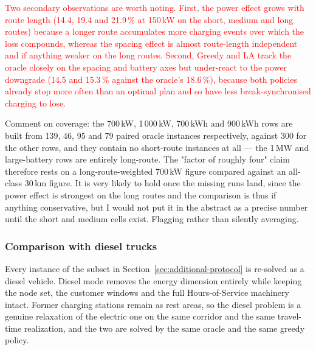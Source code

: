 \documentclass[preprint,12pt,3p]{elsarticle}
\newcommand{\red}[1]{\textcolor{red}{#1}}
\newcommand{\green}[1]{{\color{darkgreen}#1}}
\begin{document}
\red{Two secondary observations are worth noting. First, the power effect grows
with route length (14.4, 19.4 and 21.9\,\% at 150\,kW on the short, medium and
long routes) because a longer route accumulates more charging events over which
the loss compounds, whereas the spacing effect is almost route-length
independent and if anything weaker on the long routes. Second, Greedy and LA
track the oracle closely on the spacing and battery axes but under-react to the
power downgrade (14.5 and 15.3\,\% against the oracle's 18.6\,\%), because both
policies already stop more often than an optimal plan and so have less
break-synchronised charging to lose.}

\green{Comment on coverage: the 700\,kW, 1\,000\,kW, 700\,kWh and 900\,kWh rows
are built from 139, 46, 95 and 79 paired oracle instances respectively, against
300 for the other rows, and they contain no short-route instances at all --- the
1\,MW and large-battery rows are entirely long-route. The "factor of roughly
four" claim therefore rests on a long-route-weighted 700\,kW figure compared
against an all-class 30\,km figure. It is very likely to hold once the missing
runs land, since the power effect is strongest on the long routes and the
comparison is thus if anything conservative, but I would not put it in the
abstract as a precise number until the short and medium cells exist. Flagging
rather than silently averaging.}


\subsubsection{Comparison with diesel trucks}
\label{sec:diesel}

Every instance of the subset in Section~\ref{sec:additional-protocol} is re-solved as a diesel vehicle. Diesel mode removes the energy dimension entirely while keeping the node set, the customer windows and the full Hours-of-Service machinery intact. Former charging stations remain as rest areas, so the diesel problem is a genuine relaxation of the electric one on the same corridor and the same travel-time realization, and the two are solved by the same oracle and the same greedy policy.
\end{document}
